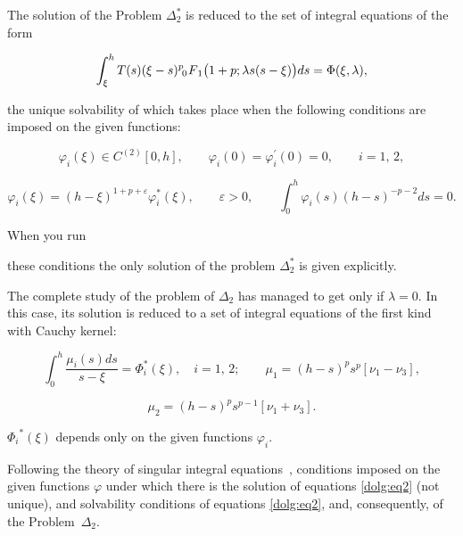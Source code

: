 The solution of the Problem $\Delta_2^*$ is reduced to the set of integral equations of the form

$$ \int _\xi^h T(s) (\xi-s)^p  \,\,

F_{\hspace{-4mm}0 \hspace{3mm}1} \bigl(1+p; \lambda s (s-\xi)\bigr) ds = \Phi(\xi, \lambda), $$

the unique solvability of which takes place when the following conditions are imposed on the given functions:

$$ \varphi_i(\xi) \in C^{(2)}

 [0, h], \qquad \varphi_i(0) = \varphi_i^\prime(0) = 0, \qquad i = 1, \, 2, $$

$$ \varphi_i(\xi) = (h-\xi)^{1+p+\varepsilon} \varphi_i^\ast(\xi), \qquad \varepsilon>0, \qquad \int_0^h \varphi_i(s) (h-s)^{-p-2} ds=0. $$



When you run

these conditions the only solution of the problem $\Delta_2^*$ is given explicitly.



The complete study of the problem of $\Delta_2$ has managed to get only if $\lambda=0$. In this case, its solution is reduced to a set of integral equations of the first kind with Cauchy kernel:

$$ \int _0^h \frac{\mu_i(s) ds}{s-\xi} = \Phi_i^\ast(\xi), \quad i= 1, \, 2;  \qquad \mu_1 = (h-s)^p s^p [\nu_1- \nu_3],$$

\begin{equation}

\label{dolg:eq2}

\mu_2 = (h-s)^p s^{p-1} [\nu_1 + \nu_3]. 

\end{equation}

${\Phi_i}^\ast(\xi)$ depends only on the given functions $\varphi_i$.



\smallskip




Following the theory of singular integral equa\-tions~\cite{dolg:12}, conditions imposed on the given functions $\varphi$ under which there is the solution of equations \eqref{dolg:eq2} (not unique), and solvability conditions of equations \eqref{dolg:eq2}, and, consequently, of the Problem~$\Delta_2$.



